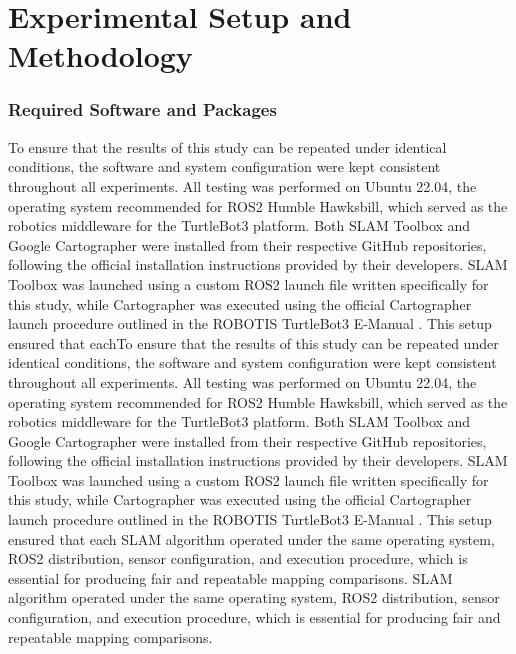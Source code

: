 \documentclass[runningheads,11pt]{llncs_bigfont_absbib}
\begin{document}
\section{Experimental Setup and Methodology}
\subsubsection{Required Software and Packages}
To ensure that the results of this study can be repeated under identical conditions, the software and system configuration were kept consistent throughout all experiments. All testing was performed on Ubuntu 22.04, the operating system recommended for ROS2 Humble Hawksbill, which served as the robotics middleware for the TurtleBot3 platform. Both SLAM Toolbox and Google Cartographer were installed from their respective GitHub repositories, following the official installation instructions provided by their developers. SLAM Toolbox was launched using a custom ROS2 launch file written specifically for this study, while Cartographer was executed using the official Cartographer launch procedure outlined in the ROBOTIS TurtleBot3 E-Manual \cite{ROBOTIS_TB3_SlamTab,ROBOTOIS_Cartographer}.
This setup ensured that eachTo ensure that the results of this study can be repeated under identical conditions, the software and system configuration were kept consistent throughout all experiments. All testing was performed on Ubuntu 22.04, the operating system recommended for ROS2 Humble Hawksbill, which served as the robotics middleware for the TurtleBot3 platform. Both SLAM Toolbox and Google Cartographer were installed from their respective GitHub repositories, following the official installation instructions provided by their developers. SLAM Toolbox was launched using a custom ROS2 launch file written specifically for this study, while Cartographer was executed using the official Cartographer launch procedure outlined in the ROBOTIS TurtleBot3 E-Manual \cite{ROBOTIS_TB3_SlamTab,ROBOTOIS_Cartographer}. This setup ensured that each SLAM algorithm operated under the same operating system, ROS2 distribution, sensor configuration,
and execution procedure, which is essential for producing fair and repeatable mapping comparisons. SLAM algorithm operated under the same operating system, ROS2 distribution, sensor configuration, 
and execution procedure, which is essential for producing fair and repeatable mapping comparisons.
\end{document}
